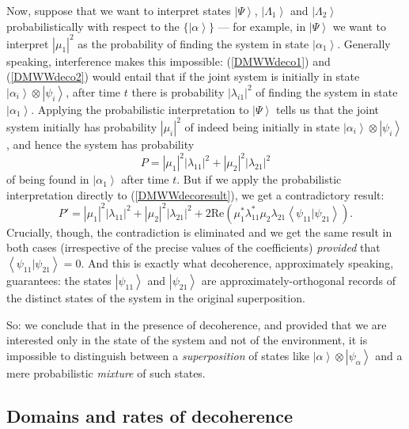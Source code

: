 \documentclass[12pt]{article}
\newcommand{\be}{\begin{equation}}
\newcommand{\ee}{\end{equation}}
\newcommand{\ket}[1]{\ensuremath{\left|  #1 \right\rangle}}
\newcommand{\bk}[2]{\ensuremath{\left\langle #1 | #2 \right\rangle}}
\newcommand{\tpk}[2]{\ensuremath{\ket{#1}\!\otimes\!\ket{#2}}}
\begin{document}
Now, suppose that we want to interpret states \ket{\Psi}, \ket{\Lambda_1} and \ket{\Lambda_2} probabilistically with respect to the $\{\ket{\alpha}\}$ --- for example, in \ket{\Psi} we want to interpret $|\mu_1|^2$ as the probability of finding the system in state \ket{\alpha_1}. Generally speaking, interference makes this impossible: (\ref{DMWWdeco1}) and (\ref{DMWWdeco2}) would entail that if the joint system is initially  in state \tpk{\alpha_i}{\psi_i}, after time $t$ there is probability $|\lambda_{i1}|^2$ of finding the system in state $\ket{\alpha_1}$. Applying the probabilistic interpretation to \ket{\Psi} tells us that the joint system initially has probability $|\mu_i|^2$ of indeed being initially in state \tpk{\alpha_i}{\psi_i}, and hence the system has probability
\be P= |\mu_1|^2 |\lambda_{11}|^2 + |\mu_2|^2 |\lambda_{21}|^2
\ee
of being found in $\ket{\alpha_1}$ after time $t$. But if we apply the probabilistic interpretation directly to (\ref{DMWWdecoresult}), we get a contradictory result:
\be
P' = |\mu_1|^2 |\lambda_{11}|^2 + |\mu_2|^2 |\lambda_{21}|^2 + 2\mathrm{\mbox{Re}}(\mu_1^*\lambda_{11}^*\mu_2\lambda_{21}\bk{\psi_{11}}{\psi_{21}}).
\ee
Crucially, though, the contradiction is eliminated and we get the same result in both cases (irrespective of the precise values of the coefficients) \emph{provided} that $\bk{\psi_{11}}{\psi_{21}}=0$. And this is exactly what decoherence, approximately speaking, guarantees: the states \ket{\psi_{11}} and \ket{\psi_{21}} are approximately-orthogonal records of the distinct states of the system in the original superposition.

So: we conclude that in the presence of decoherence, and provided that we are interested only in the state of the system and not of the environment, it is impossible to distinguish between a \emph{superposition} of states like $\tpk{\alpha}{\psi_\alpha}$ and a mere probabilistic \emph{mixture} of such states. 

\subsection{Domains and rates of decoherence}\label{DMWWdecoherencerates}
\end{document}
